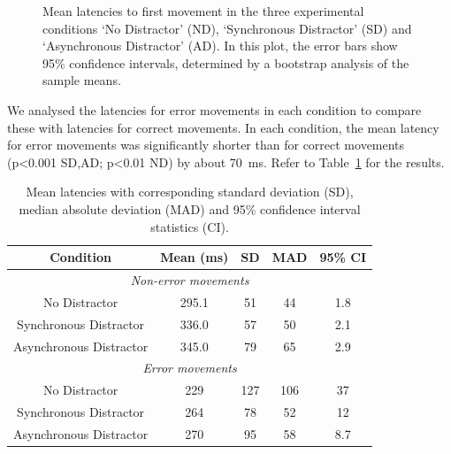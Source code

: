 \documentclass[10pt,letterpaper]{article}
\begin{document}
\begin{figure}[htb!]
\centering
\caption[Mean latencies] {Mean latencies to first movement in the
  three experimental conditions `No Distractor' (ND), `Synchronous
  Distractor' (SD) and `Asynchronous Distractor' (AD). In this plot,
  the error bars show 95\% confidence intervals, determined by
  a bootstrap analysis of the sample means.}
\label{meanmad}
\end{figure}

We analysed the latencies for error movements in each condition to
compare these with latencies for correct movements. In each condition,
the mean latency for error movements was significantly shorter than
for correct movements (p\textless0.001 SD,AD; p\textless0.01 ND) by
about 70~ms. Refer to Table~\ref{table:latencies} for the results.

\begin{table}[ht]
\caption{Mean latencies with corresponding standard deviation (SD),
  median absolute deviation (MAD) and 95\% confidence interval
  statistics (CI).}  \centering
\begin{tabular}{c c c c c}
\hline
\textbf{Condition} & \textbf{Mean (ms)} & \textbf{SD} & \textbf{MAD} & \textbf{95\% CI} \\ [0.5ex]
\hline
\multicolumn{5}{c}{\emph{Non-error movements}} \\
\hline
No Distractor           & 295.1 & 51 & 44 & 1.8 \\
Synchronous Distractor  & 336.0 & 57 & 50 & 2.1 \\
Asynchronous Distractor & 345.0 & 79 & 65 & 2.9 \\ [1ex]
\hline
\multicolumn{5}{c}{\emph{Error movements}} \\
\hline
No Distractor           & 229 & 127 & 106 & 37  \\
Synchronous Distractor  & 264 &  78 &  52 & 12  \\
Asynchronous Distractor & 270 &  95 &  58 & 8.7 \\ [1ex]
\hline
\end{tabular}
\label{table:latencies}
\end{table}

\end{document}

